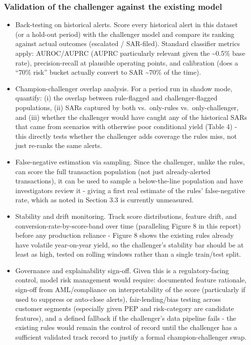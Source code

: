 \documentclass[
]{article}
\begin{document}
\subsubsection{Validation of the challenger against the existing
model}\label{validation-of-the-challenger-against-the-existing-model}

\begin{itemize}
\item
  Back-testing on historical alerts. Score every historical alert in
  this dataset (or a hold-out period) with the challenger model and
  compare its ranking against actual outcomes (escalated / SAR-filed).
  Standard classifier metrics apply: AUROC/AUPRC (AUPRC particularly
  relevant given the \textasciitilde0.5\% base rate), precision-recall
  at plausible operating points, and calibration (does a ``70\% risk''
  bucket actually convert to SAR \textasciitilde70\% of the time).
\item
  Champion-challenger overlap analysis. For a period run in shadow mode,
  quantify: (i) the overlap between rule-flagged and challenger-flagged
  populations, (ii) SARs captured by both vs.~only-rules
  vs.~only-challenger, and (iii) whether the challenger would have
  caught any of the historical SARs that came from scenarios with
  otherwise poor conditional yield (Table 4) - this directly tests
  whether the challenger adds coverage the rules miss, not just re-ranks
  the same alerts.
\item
  False-negative estimation via sampling. Since the challenger, unlike
  the rules, can score the full transaction population (not just
  already-alerted transactions), it can be used to sample a
  below-the-line population and have investigators review it - giving a
  first real estimate of the rules' false-negative rate, which as noted
  in Section 3.3 is currently unmeasured.
\item
  Stability and drift monitoring. Track score distributions, feature
  drift, and conversion-rate-by-score-band over time (paralleling Figure
  8 in this report) before any production reliance - Figure 8 shows the
  existing rules already have volatile year-on-year yield, so the
  challenger's stability bar should be at least as high, tested on
  rolling windows rather than a single train/test split.
\item
  Governance and explainability sign-off. Given this is a
  regulatory-facing control, model risk management would require:
  documented feature rationale, sign-off from AML/compliance on
  interpretability of the score (particularly if used to suppress or
  auto-close alerts), fair-lending/bias testing across customer segments
  (especially given PEP and risk-category are candidate features), and a
  defined fallback if the challenger's data pipeline fails - the
  existing rules would remain the control of record until the challenger
  has a sufficient validated track record to justify a formal
  champion-challenger swap.
\end{itemize}
\end{document}
